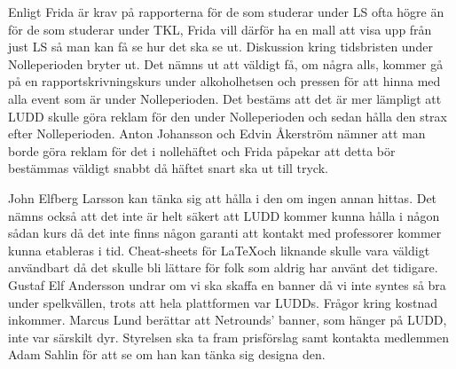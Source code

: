 \documentclass{protokoll}
\begin{document}
Enligt Frida är krav på rapporterna för de som studerar under LS ofta högre än för de som studerar under TKL, Frida vill därför ha en mall att visa upp från just LS så man kan få se hur det ska se ut.  
Diskussion kring tidsbristen under Nolleperioden bryter ut. Det nämns ut att väldigt få, om några alls, kommer gå på en rapportskrivningskurs under alkoholhetsen och pressen för att hinna med alla event som är under Nolleperioden. Det bestäms att det är mer lämpligt att LUDD skulle göra reklam för den under Nolleperioden och sedan hålla den strax efter Nolleperioden. Anton Johansson och Edvin Åkerström nämner att man borde göra reklam för det i nollehäftet och Frida påpekar att detta bör bestämmas väldigt snabbt då häftet snart ska ut till tryck.  

John Elfberg Larsson kan tänka sig att hålla i den om ingen annan hittas. 
Det nämns också att det inte är helt säkert att LUDD kommer kunna hålla i någon sådan kurs då det inte finns någon garanti att kontakt med professorer kommer kunna etableras i tid. 
Cheat-sheets för \LaTeX och liknande skulle vara väldigt användbart då det skulle bli lättare för folk som aldrig har använt det tidigare.  
Gustaf Elf Andersson undrar om vi ska skaffa en banner då vi inte syntes så bra under spelkvällen, trots att hela plattformen var LUDDs. Frågor kring kostnad inkommer. 
Marcus Lund berättar att Netrounds' banner, som hänger på LUDD, inte var särskilt dyr. 
Styrelsen ska ta fram prisförslag samt kontakta medlemmen Adam Sahlin för att se om han kan tänka sig designa den.
\end{document}
